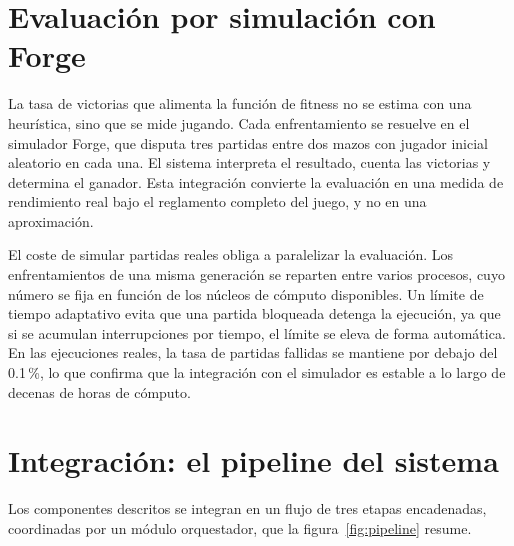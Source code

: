 \section{Evaluación por simulación con Forge}
\label{sec:evaluacion}

La tasa de victorias que alimenta la función de fitness no se estima con una heurística, sino que se mide jugando. Cada enfrentamiento se resuelve en el simulador Forge, que disputa tres partidas entre dos mazos con jugador inicial aleatorio en cada una. El sistema interpreta el resultado, cuenta las victorias y determina el ganador. Esta integración convierte la evaluación en una medida de rendimiento real bajo el reglamento completo del juego, y no en una aproximación.

El coste de simular partidas reales obliga a paralelizar la evaluación. Los enfrentamientos de una misma generación se reparten entre varios procesos, cuyo número se fija en función de los núcleos de cómputo disponibles. Un límite de tiempo adaptativo evita que una partida bloqueada detenga la ejecución, ya que si se acumulan interrupciones por tiempo, el límite se eleva de forma automática. En las ejecuciones reales, la tasa de partidas fallidas se mantiene por debajo del 0.1\,\%, lo que confirma que la integración con el simulador es estable a lo largo de decenas de horas de cómputo.

\section{Integración: el pipeline del sistema}
\label{sec:pipeline}

Los componentes descritos se integran en un flujo de tres etapas encadenadas, coordinadas por un módulo orquestador, que la figura~\ref{fig:pipeline} resume.

